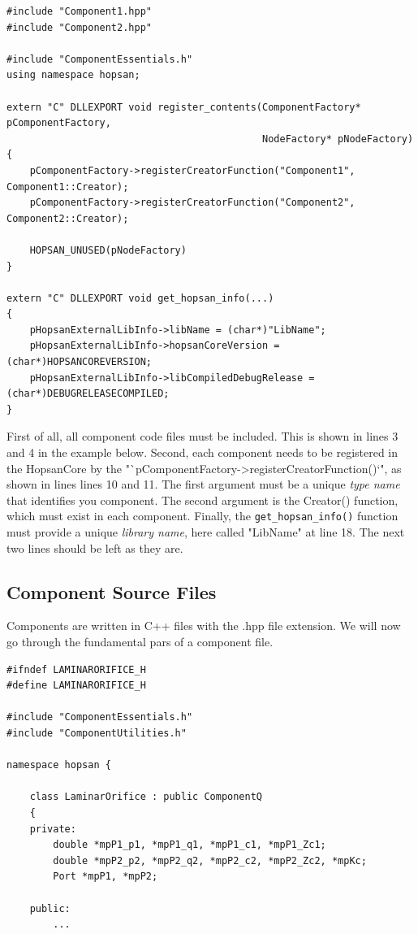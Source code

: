 \documentclass[a4paper,pdftex]{article}
\begin{document}
\begin{minipage}{\linewidth}
\begin{lstlisting}[basicstyle=\footnotesize\ttfamily]
#include "Component1.hpp"
#include "Component2.hpp"

#include "ComponentEssentials.h"
using namespace hopsan;

extern "C" DLLEXPORT void register_contents(ComponentFactory* pComponentFactory, 
                                            NodeFactory* pNodeFactory)
{    
    pComponentFactory->registerCreatorFunction("Component1", Component1::Creator);
    pComponentFactory->registerCreatorFunction("Component2", Component2::Creator);

    HOPSAN_UNUSED(pNodeFactory)
}

extern "C" DLLEXPORT void get_hopsan_info(...)
{
    pHopsanExternalLibInfo->libName = (char*)"LibName";
    pHopsanExternalLibInfo->hopsanCoreVersion = (char*)HOPSANCOREVERSION;
    pHopsanExternalLibInfo->libCompiledDebugRelease = (char*)DEBUGRELEASECOMPILED;
}
\end{lstlisting}
\end{minipage}

\noindent First of all, all component code files must be included. This is shown in lines 3 and 4 in the example below.
Second, each component needs to be registered in the HopsanCore by the "`pComponentFactory->registerCreatorFunction()`", as shown in lines  lines 10 and 11.
The first argument must be a unique \textit{type name} that identifies you component. 
The second argument is the Creator() function, which must exist in each component.
Finally, the \texttt{get\_hopsan\_info()} function must provide a unique \textit{library name}, here called "LibName" at line 18. 
The next two lines should be left as they are.

\subsection*{Component Source Files}
Components are written in C++ files with the .hpp file extension. 
We will now go through the fundamental pars of a component file.\\

\begin{minipage}{\linewidth}
\begin{lstlisting}[basicstyle=\footnotesize\ttfamily]
#ifndef LAMINARORIFICE_H
#define LAMINARORIFICE_H

#include "ComponentEssentials.h"
#include "ComponentUtilities.h"

namespace hopsan {

    class LaminarOrifice : public ComponentQ
    {
    private:
        double *mpP1_p1, *mpP1_q1, *mpP1_c1, *mpP1_Zc1;
        double *mpP2_p2, *mpP2_q2, *mpP2_c2, *mpP2_Zc2, *mpKc;
        Port *mpP1, *mpP2;
       
    public:
        ...
\end{lstlisting}
\end{minipage}
\end{document}
